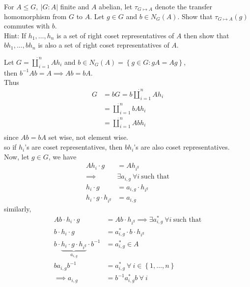 \documentclass{article}
\begin{document}
\pagebreak

\begin{homeworkProblem}
For $A \leq G, \ \lvert G:A \rvert$ finite and $A$ abelian,
let $\tau_{G \mapsto A}$ denote the transfer 
homomorphism from $G$ to $A$. Let $g \in G$
and $b \in N_G(A)$. Show that 
$\tau_{G \mapsto A} (g)$ commutes with $b$.\\
Hint: If $ h_1, \ldots, h_{n} $ is a set of right coset representatives 
of $A$ then show that $ bh_1, \ldots, bh_n $ is also a set of right
coset representatives of $A$.\\

\solution

Let $G = \dot{\coprod}_{i=1}^{n} A h_i$ and $b \in N_G(A) = \left\{ g\in G: g A = A g\right\} $,\\
then $b^{-1} A b = A \implies Ab = bA$.\\
Thus 
\begin{align}
    G &= b G = b \dot{\coprod}_{i=1}^{n} A h_i \\
    &= \dot{\coprod}_{i=1}^n b A h_i\\
    &= \dot{\coprod}_{i=1}^{n} A b h_i\\
\end{align}
since $Ab = bA$ set wise, not element wise.\\
so if $h_i$'s are coset representatives,
then $bh_i$'s are also coset representatives.\\
Now, let $g \in G$, we have 
\begin{align}
    A h_i \cdot g &= A h_{i^g} \\
    \implies &\exists a_{i,g} \ \forall i \ \text{such that}\\
    h_i \cdot g &= a_{i,g} \cdot h_{i^g}\\
    h_i \cdot g \cdot h_{i^g} &= a_{i,g}
\end{align}
similarly,
\begin{align}
    A b \cdot h_i \cdot g &= A b \cdot h_{i^g} \implies \exists a^{*}_{i,g} \ \forall i \ \text{such that}\\
    b \cdot h_i \cdot g &= a^{*}_{i,g} \cdot b \cdot h_{i^g}\\
    b \cdot \underbrace{h_i \cdot g \cdot h_{i^g}}_{a_{i,g}} \cdot b^{-1} &= a^{*}_{i,g} \in A\\
    b a_{i,g} b^{-1} &= a^{*}_{i,g} \ \forall \ i \in \left\{ 1, \ldots, n \right\}\\
    \implies a_{i,g} &= b^{-1} a^{*}_{i,g} b \ \forall \ i
\end{align}

\end{homeworkProblem}
\end{document}

